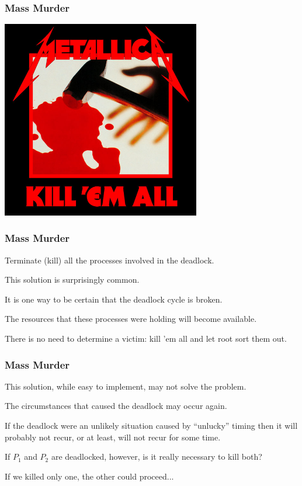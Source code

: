 \begin{frame}
\frametitle{Mass Murder}

\begin{center}
\includegraphics[width=0.65\textwidth]{images/killemall.jpg}
\end{center}

\end{frame}

\begin{frame}
\frametitle{Mass Murder}

Terminate (kill) all the processes involved in the deadlock. 

This solution is surprisingly common. 

It is one way to be certain that the deadlock cycle is broken. 

The resources that these processes were holding will become available. 

There is no need to determine a victim: kill 'em all and let root sort them out.

\end{frame}

\begin{frame}
\frametitle{Mass Murder}

This solution, while easy to implement, may not solve the problem. 

The circumstances that caused the deadlock may occur again. 

If the deadlock were an unlikely situation caused by ``unlucky'' timing then it will probably not recur, or at least, will not recur for some time.

If $P_{1}$ and $P_{2}$ are deadlocked, however, is it really necessary to kill both? 

If we killed only one, the other could proceed...

\end{frame}


